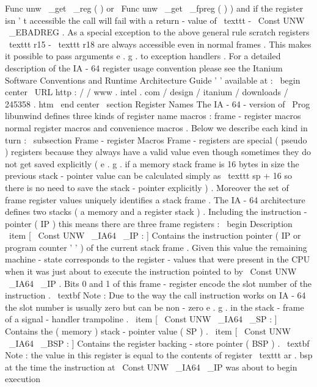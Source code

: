 Func
{
unw
\
_get
\
_reg
}
(
)
or
\
Func
{
unw
\
_get
\
_fpreg
}
(
)
)
and
if
the
register
isn
'
t
accessible
the
call
will
fail
with
a
return
-
value
of
\
texttt
{
-
}
\
Const
{
UNW
\
_EBADREG
}
.
As
a
special
exception
to
the
above
general
rule
scratch
registers
\
texttt
{
r15
}
-
\
texttt
{
r18
}
are
always
accessible
even
in
normal
frames
.
This
makes
it
possible
to
pass
arguments
e
.
g
.
to
exception
handlers
.
For
a
detailed
description
of
the
IA
-
64
register
usage
convention
please
see
the
Itanium
Software
Conventions
and
Runtime
Architecture
Guide
'
'
available
at
:
\
begin
{
center
}
\
URL
{
http
:
/
/
www
.
intel
.
com
/
design
/
itanium
/
downloads
/
245358
.
htm
}
\
end
{
center
}
\
section
{
Register
Names
}
The
IA
-
64
-
version
of
\
Prog
{
libunwind
}
defines
three
kinds
of
register
name
macros
:
frame
-
register
macros
normal
register
macros
and
convenience
macros
.
Below
we
describe
each
kind
in
turn
:
\
subsection
{
Frame
-
register
Macros
}
Frame
-
registers
are
special
(
pseudo
)
registers
because
they
always
have
a
valid
value
even
though
sometimes
they
do
not
get
saved
explicitly
(
e
.
g
.
if
a
memory
stack
frame
is
16
bytes
in
size
the
previous
stack
-
pointer
value
can
be
calculated
simply
as
\
texttt
{
sp
+
16
}
so
there
is
no
need
to
save
the
stack
-
pointer
explicitly
)
.
Moreover
the
set
of
frame
register
values
uniquely
identifies
a
stack
frame
.
The
IA
-
64
architecture
defines
two
stacks
(
a
memory
and
a
register
stack
)
.
Including
the
instruction
-
pointer
(
IP
)
this
means
there
are
three
frame
registers
:
\
begin
{
Description
}
\
item
[
\
Const
{
UNW
\
_IA64
\
_IP
}
:
]
Contains
the
instruction
pointer
(
IP
or
program
counter
'
'
)
of
the
current
stack
frame
.
Given
this
value
the
remaining
machine
-
state
corresponds
to
the
register
-
values
that
were
present
in
the
CPU
when
it
was
just
about
to
execute
the
instruction
pointed
to
by
\
Const
{
UNW
\
_IA64
\
_IP
}
.
Bits
0
and
1
of
this
frame
-
register
encode
the
slot
number
of
the
instruction
.
\
textbf
{
Note
:
}
Due
to
the
way
the
call
instruction
works
on
IA
-
64
the
slot
number
is
usually
zero
but
can
be
non
-
zero
e
.
g
.
in
the
stack
-
frame
of
a
signal
-
handler
trampoline
.
\
item
[
\
Const
{
UNW
\
_IA64
\
_SP
}
:
]
Contains
the
(
memory
)
stack
-
pointer
value
(
SP
)
.
\
item
[
\
Const
{
UNW
\
_IA64
\
_BSP
}
:
]
Contains
the
register
backing
-
store
pointer
(
BSP
)
.
\
textbf
{
Note
:
}
the
value
in
this
register
is
equal
to
the
contents
of
register
\
texttt
{
ar
.
bsp
}
at
the
time
the
instruction
at
\
Const
{
UNW
\
_IA64
\
_IP
}
was
about
to
begin
execution
